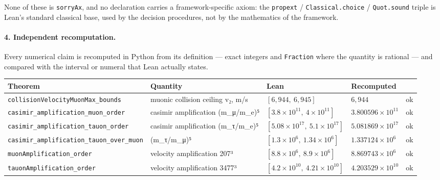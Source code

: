 \documentclass[11pt,a4paper]{article}
\begin{document}
\noindent None of these is \texttt{sorryAx}, and no declaration carries a
framework-specific axiom: the \texttt{propext} / \texttt{Classical.choice} /
\texttt{Quot.sound} triple is Lean's standard classical base, used by the
decision procedures, not by the mathematics of the framework.

\paragraph{4. Independent recomputation.}
Every numerical claim is recomputed in Python from its definition --- exact
integers and \texttt{Fraction} where the quantity is rational --- and compared
with the interval or numeral that Lean actually states.

{\footnotesize
\begin{longtable}{@{}p{}p{}p{}p{}p{}@{}}
\toprule
Theorem & Quantity & Lean & Recomputed & \\
\midrule
\endhead
\texttt{\scriptsize collisionVelocityMuonMax\_\allowbreak{}bounds} & muonic collision ceiling v₂, m/s & $[6{,}944,\ 6{,}945]$ & $6{,}944$ & \textcolor{okgreen}{ok} \\
\texttt{\scriptsize casimir\_\allowbreak{}amplification\_\allowbreak{}muon\_\allowbreak{}order} & casimir amplification (m\_\allowbreak{}μ/m\_\allowbreak{}e)⁵ & $[3.8 \times 10^{11},\ 4 \times 10^{11}]$ & $3.800596 \times 10^{11}$ & \textcolor{okgreen}{ok} \\
\texttt{\scriptsize casimir\_\allowbreak{}amplification\_\allowbreak{}tauon\_\allowbreak{}order} & casimir amplification (m\_\allowbreak{}τ/m\_\allowbreak{}e)⁵ & $[5.08 \times 10^{17},\ 5.1 \times 10^{17}]$ & $5.081869 \times 10^{17}$ & \textcolor{okgreen}{ok} \\
\texttt{\scriptsize casimir\_\allowbreak{}amplification\_\allowbreak{}tauon\_\allowbreak{}over\_\allowbreak{}muon} & (m\_\allowbreak{}τ/m\_\allowbreak{}μ)⁵ & $[1.3 \times 10^{6},\ 1.34 \times 10^{6}]$ & $1.337124 \times 10^{6}$ & \textcolor{okgreen}{ok} \\
\texttt{\scriptsize muonAmplification\_\allowbreak{}order} & velocity amplification 207³ & $[8.8 \times 10^{6},\ 8.9 \times 10^{6}]$ & $8.869743 \times 10^{6}$ & \textcolor{okgreen}{ok} \\
\texttt{\scriptsize tauonAmplification\_\allowbreak{}order} & velocity amplification 3477³ & $[4.2 \times 10^{10},\ 4.21 \times 10^{10}]$ & $4.203529 \times 10^{10}$ & \textcolor{okgreen}{ok} \\

\end{longtable}}
\end{document}
